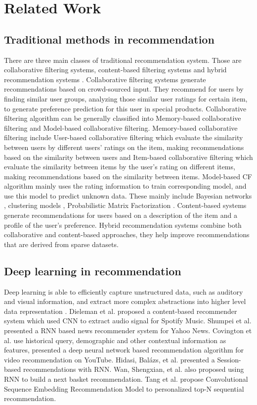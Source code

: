\documentclass[runningheads]{llncs}
\begin{document}
\section{Related Work}
\subsection{Traditional methods in recommendation}

There are three main classes of traditional recommendation system. Those are collaborative filtering systems, content-based filtering systems and hybrid recommendation systems \cite{12}. Collaborative filtering \cite{1,2,3,4} systems generate recommendations based on crowd-sourced input. They recommend for users by finding similar user groups, analyzing those similar user ratings for certain item, to generate preference prediction for this user in special products. Collaborative filtering algorithm can be generally classified into Memory-based \cite{1,2} collaborative filtering and Model-based \cite{3,4,5}collaborative filtering. Memory-based collaborative filtering include User-based collaborative filtering \cite{1} which evaluate the similarity between users by different users’ ratings on the item, making recommendations based on the similarity between users and Item-based collaborative filtering \cite{2} which evaluate the similarity between items by the user’s rating on different items, making recommendations based on the similarity between items. Model-based CF algorithm mainly uses the rating information to train corresponding model, and use this model to predict unknown data. These mainly include Bayesian networks \cite{3}, clustering models \cite{4}, Probabilistic Matrix Factorization \cite{5}. Content-based systems \cite{6} generate recommendations for users based on a description of the item and a profile of the user’s preference. Hybrid recommendation systems \cite{7} combine both collaborative and content-based approaches, they help improve recommendations that are derived from sparse datasets.

\subsection{Deep learning in recommendation}
Deep learning is able to efficiently capture unstructured data, such as auditory and visual information, and extract more complex abstractions into higher level data representation \cite{20}. Dieleman et al. \cite{8} proposed a content-based recommender system which used CNN to extract audio signal for Spotify Music. Shumpei et al. \cite{9} presented a RNN based news recommender system for Yahoo News. Covington et al. \cite{10} use historical query, demographic and other contextual information as features, presented a deep neural network based recommendation algorithm for video recommendation on YouTube. Hidasi, Balázs, et al. \cite{11} presented a Session-based recommendations with RNN. Wan, Shengxian, et al. \cite{15} also proposed using RNN to build a next basket recommendation. Tang et al. \cite{23} propose Convolutional Sequence Embedding Recommendation Model to personalized top-N sequential recommendation.
\end{document}
